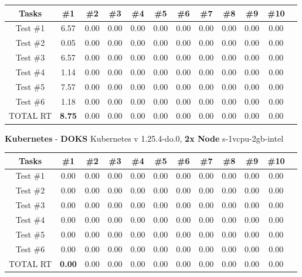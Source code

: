 \begin{tabular}{ |c|c|c|c|c|c|c|c|c|c|c|c| } 
    \hline
    Tasks & \#1 & \#2& \#3& \#4& \#5& \#6& \#7& \#8& \#9& \#10 \\
    \hline
    Test \#1 & 6.57 & 0.00& 0.00& 0.00& 0.00& 0.00& 0.00& 0.00& 0.00& 0.00 \\ 
    Test \#2 & 0.05 & 0.00& 0.00& 0.00& 0.00& 0.00& 0.00& 0.00& 0.00& 0.00 \\ 
    Test \#3 & 6.57 & 0.00& 0.00& 0.00& 0.00& 0.00& 0.00& 0.00& 0.00& 0.00 \\ 
    Test \#4 & 1.14 & 0.00& 0.00& 0.00& 0.00& 0.00& 0.00& 0.00& 0.00& 0.00 \\ 
    Test \#5 & 7.57 & 0.00& 0.00& 0.00& 0.00& 0.00& 0.00& 0.00& 0.00& 0.00 \\ 
    Test \#6 & 1.18 & 0.00& 0.00& 0.00& 0.00& 0.00& 0.00& 0.00& 0.00& 0.00 \\ 
    TOTAL RT & \textbf{8.75} & 0.00& 0.00& 0.00& 0.00& 0.00& 0.00& 0.00& 0.00& 0.00 \\ 
    \hline
\end{tabular}
\newline
\textbf{Kubernetes} - \textbf{DOKS} Kubernetes v 1.25.4-do.0, \textbf{2x Node} s-1vcpu-2gb-intel
\newline
\begin{tabular}{ |c|c|c|c|c|c|c|c|c|c|c|c| } 
    \hline
    Tasks & \#1 & \#2& \#3& \#4& \#5& \#6& \#7& \#8& \#9& \#10 \\
    \hline
    Test \#1 & 0.00 & 0.00& 0.00& 0.00& 0.00& 0.00& 0.00& 0.00& 0.00& 0.00 \\ 
    Test \#2 & 0.00 & 0.00& 0.00& 0.00& 0.00& 0.00& 0.00& 0.00& 0.00& 0.00 \\ 
    Test \#3 & 0.00 & 0.00& 0.00& 0.00& 0.00& 0.00& 0.00& 0.00& 0.00& 0.00 \\ 
    Test \#4 & 0.00 & 0.00& 0.00& 0.00& 0.00& 0.00& 0.00& 0.00& 0.00& 0.00 \\ 
    Test \#5 & 0.00 & 0.00& 0.00& 0.00& 0.00& 0.00& 0.00& 0.00& 0.00& 0.00 \\ 
    Test \#6 & 0.00 & 0.00& 0.00& 0.00& 0.00& 0.00& 0.00& 0.00& 0.00& 0.00 \\ 
    TOTAL RT & \textbf{0.00} & 0.00& 0.00& 0.00& 0.00& 0.00& 0.00& 0.00& 0.00& 0.00 \\ 
    \hline
\end{tabular}
